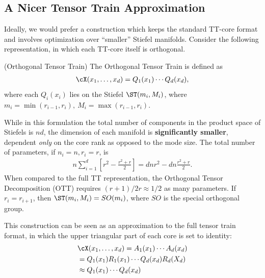 \subsection{A Nicer Tensor Train Approximation}
Ideally, we would prefer a construction which keeps the standard TT-core format and involves optimization over ``smaller'' Stiefel manifolds. Consider the following representation, in which each TT-core itself is orthogonal.
\begin{definition}\label{def:ott}(Orthogonal Tensor Train)
The Orthogonal Tensor Train is defined as
\begin{align}
\cX(x_1,\ldots,x_d) = Q_1(x_1) \cdots Q_d(x_d),
\end{align}
where each $Q_i(x_i)$ lies on the Stiefel $\ST(m_i, M_i)$, where $m_i = \min(r_{i-1},r_i), \ M_i = \max(r_{i-1},r_i)$.
\end{definition}
While in this formulation the total number of components in the product space of Stiefels is $nd$, the dimension of each manifold is {\bf significantly smaller},
dependent {\em only} on the core rank as opposed to the mode size.
The total number of parameters, if $n_i =n, r_i = r$, is
\begin{align}
n \sum_{i=1}^d \left[ r^2 - \frac{r^2 + r}{2}\right] = d n r^2 - dn\frac{r^2 + r}{2}.
\end{align}
When compared to the full TT representation,
the Orthogonal Tensor Decomposition (OTT) requires
$(r+1)/2r \approx 1/2$ as many parameters.
If $r_i=r_{i+1}$, then $\ST(m_i, M_i) = SO(m_i)$, where $SO$ is the special orthogonal group.

This construction can be seen as an approximation to the full tensor train format, in which the upper triangular part of each core is set to identity:
\begin{align}
    &\cX(x_1,\ldots,x_d) = A_1(x_1)\cdots A_d(x_d) \nonumber\\ &= Q_1(x_1)R_1(x_1)\cdots Q_d(x_d)R_d(X_d) \nonumber\\
    &\approx Q_1(x_1) \cdots Q_d(x_d)
\end{align}

